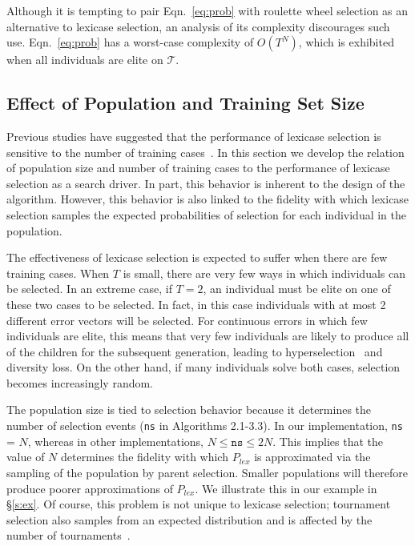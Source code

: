 \documentclass[twoside]{article}
\begin{document}
Although it is tempting to pair Eqn.~\ref{eq:prob} with roulette wheel selection as an alternative to lexicase selection, an analysis of its complexity discourages such use. Eqn.~\ref{eq:prob} has a worst-case complexity of $O(T^N)$, which is exhibited when all individuals are elite on $\mathcal{T}$. 

 
\subsection{Effect of Population and Training Set Size}

Previous studies have suggested that the performance of lexicase selection is sensitive to the number of training cases~\citep{liskowski_comparison_2015}. In this section we develop the relation of population size and number of training cases to the performance of lexicase selection as a search driver. In part, this behavior is inherent to the design of the algorithm. However, this behavior is also linked to the fidelity with which lexicase selection samples the expected probabilities of selection for each individual in the population. 

The effectiveness of lexicase selection is expected to suffer when there are few training cases. When $T$ is small, there are very few ways in which individuals can be selected. In an extreme case, if $T = 2$, an individual must be elite on one of these two cases to be selected. In fact, in this case individuals with at most 2 different error vectors will be selected. For continuous errors in which few individuals are elite, this means that very few individuals are likely to produce all of the children for the subsequent generation, leading to hyperselection~\citep{helmuth_impact_2016} and diversity loss. On the other hand, if many individuals solve both cases, selection becomes increasingly random. 

The population size is tied to selection behavior because it determines the number of selection events (\texttt{ns} in Algorithms 2.1-3.3). In our implementation, \texttt{ns} = $N$, whereas in other implementations, $N \leq \texttt{ns} \leq 2N$. This implies that the value of $N$ determines the fidelity with which $P_{lex}$ is approximated via the sampling of the population by parent selection. Smaller populations will therefore produce poorer approximations of $P_{lex}$. We illustrate this in our example in \S\ref{s:ex}. Of course, this problem is not unique to lexicase selection; tournament selection also samples from an expected distribution and is affected by the number of tournaments~\citep{xie_another_2007}.  
\end{document}
